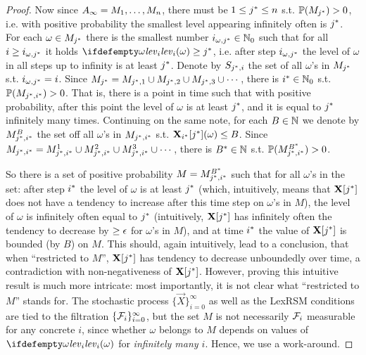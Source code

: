\begin{proof}
Now since $A_{\infty}=M_1,\dots,M_n$, there must be $1\leq {j}^* \leq n$ 
s.t. $\mathbb{P}(M_{{j}^*})>0$, i.e. with positive probability the smallest level appearing infinitely often is ${j}^*$. For each $\omega\in M_{{j}^*}$ there is the smallest number
${i}_{\omega,{j}^*}\in\mathbb{N}_0$ such that for all $i\geq {i}_{\omega,{j}^*}$ it holds 
$\levelrank{\omega}{i}\geq \fixn{j}$, i.e. after step ${i}_{\omega,{j}^*}$ the level of $\omega$ in all steps up to infinity is at least ${j}^*$. Denote by $S_{{j}^*,{i}}$ the set of all $\omega$'s in $M_{{j}^*}$ s.t. 
$i_{\omega,{j}^*}={i}$. 
Since $M_{{j}^*} = M_{{j}^*,1} \cup M_{{j}^*,2} \cup M_{{j}^*,3} \cup \cdots$, there is ${i}^*\in 
\mathbb{N}_0$ 
s.t. 
$\mathbb{P}(M_{{j}^*,{i}^*})>0$. That is, there is a point in time such that with positive probability, after this point the level of $\omega$ is at least ${j}^*$, and it is equal to ${j}^*$ infinitely many times. Continuing on the same note, for each $B\in \mathbb{N}$ we 
denote by $M_{{j}^*,{i}^*}^{B}$ the set off all $\omega$'s in $M_{{j}^*,{i}^*}$ s.t. 
$\mathbf{X}_{{i}^*}[{j}^*](\omega)\leq B$. Since $M_{{j}^*,{i}^*}= M_{{j}^*,{i}^*}^{1} \cup M_{{j}^*,{i}^*}^{2} 
\cup M_{{j}^*,{i}^*}^{3} \cup \cdots  $, there is ${B}^*\in \mathbb{N}$ s.t. 
$\mathbb{P}(M_{{j}^*,{i}^*}^{{B}^*})>0$. 

So there is a set of positive probability $M=M_{{j}^*,{i}^*}^{{B}^*}$  such that for all $\omega$'s in the set: after step ${i}^*$ the level of $\omega$ is at least ${j}^*$ (which, intuitively, means that $\mathbf{X}[{j}^*]$ does not have a tendency to increase after this time step on $\omega$'s in $M$), the level of $\omega$ is infinitely often equal to ${j}^*$ (intuitively, $\mathbf{X}[{j}^*]$ has infinitely often the tendency to decrease by $\geq \epsilon$ for $\omega$'s in $M$), and at time ${i}^*$ the value of $\mathbf{X}[{j}^*]$ is bounded (by $B$) on $M$. This should, again intuitively, lead to a conclusion, that when ``restricted to $M$'', $\mathbf{X}[{j}^*]$ has tendency to decrease unboundedly over time, a contradiction with non-negativeness of $\mathbf{X}[{j}^*]$. However, proving this intuitive result is much more intricate: most importantly, it is not clear what ``restricted to $M$'' stands for. The stochastic process $\{\vec{X}\}_{i=0}^{\infty}$ as well as the LexRSM conditions are tied to the filtration $\{\mathcal{F}_i\}_{i=0}^{\infty}$, but the set $M$ is not necessarily $\mathcal{F}_i$ measurable for any concrete $i$, since whether $\omega$ belongs to $M$ depends on values of $\levelrank{\omega}{i}$ for \emph{infinitely many $i$}. Hence, we use a work-around.


\end{proof}
